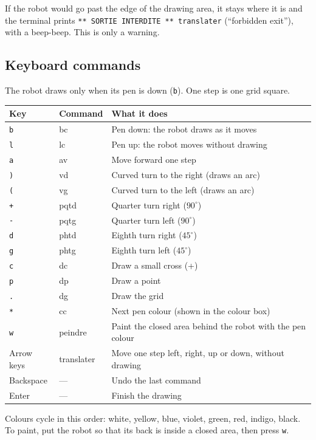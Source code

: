 \documentclass[11pt,a4paper]{article}
\newcommand{\kbd}[1]{\texttt{#1}}
\begin{document}
If the robot would go past the edge of the drawing area, it stays where it
is and the terminal prints
\kbd{** SORTIE INTERDITE ** translater} (``forbidden exit''), with a beep-beep.
This is only a warning.

\subsection{Keyboard commands}
The robot draws only when its pen is down (\kbd{b}). One step is one grid
square.

\begin{center}
\begin{tabularx}{\linewidth}{@{}l l L@{}}
\toprule
\textbf{Key} & \textbf{Command} & \textbf{What it does} \\
\midrule
\kbd{b} & bc & Pen down: the robot draws as it moves \\
\kbd{l} & lc & Pen up: the robot moves without drawing \\
\kbd{a} & av & Move forward one step \\
\kbd{)} & vd & Curved turn to the right (draws an arc) \\
\kbd{(} & vg & Curved turn to the left (draws an arc) \\
\kbd{+} & pqtd & Quarter turn right ($90^\circ$) \\
\kbd{-} & pqtg & Quarter turn left ($90^\circ$) \\
\kbd{d} & phtd & Eighth turn right ($45^\circ$) \\
\kbd{g} & phtg & Eighth turn left ($45^\circ$) \\
\kbd{c} & dc & Draw a small cross (+) \\
\kbd{p} & dp & Draw a point \\
\kbd{.} & dg & Draw the grid \\
\kbd{*} & cc & Next pen colour (shown in the colour box) \\
\kbd{w} & peindre & Paint the closed area behind the robot with the pen colour \\
Arrow keys & translater & Move one step left, right, up or down, without drawing \\
Backspace & --- & Undo the last command \\
Enter & --- & Finish the drawing \\
\bottomrule
\end{tabularx}
\end{center}

Colours cycle in this order: white, yellow, blue, violet, green, red,
indigo, black. To paint, put the robot so that its back is inside a closed
area, then press \kbd{w}.
\end{document}
